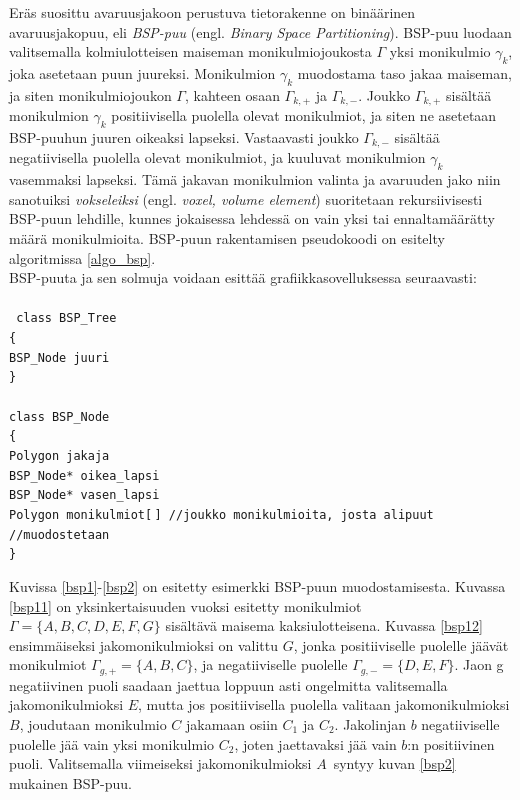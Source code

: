﻿\documentclass[a4paper, 12pt, titlepage]{article}
\newcommand{\tab}[1][0.5cm]{\hspace*{#1}} %
\newcommand{\code}[1]{\small\texttt{#1}} %
\begin{document}
Eräs suosittu avaruusjakoon perustuva tietorakenne on binäärinen avaruusjakopuu, eli \emph{BSP-puu} (engl. \emph{Binary Space Partitioning}). BSP-puu luodaan valitsemalla kolmiulotteisen maiseman  monikulmiojoukosta $\Gamma$ yksi monikulmio $\gamma_k$, joka asetetaan puun juureksi. Monikulmion $\gamma_k$ muodostama taso jakaa maiseman, ja siten monikulmiojoukon $\Gamma$, kahteen osaan $\Gamma_{k,+}$ ja $\Gamma_{k,-}$. Joukko $\Gamma_{k,+}$ sisältää monikulmion $\gamma_k$ positiivisella puolella olevat monikulmiot, ja siten ne asetetaan BSP-puuhun juuren oikeaksi lapseksi. Vastaavasti joukko $\Gamma_{k,-}$ sisältää negatiivisella puolella olevat monikulmiot, ja kuuluvat monikulmion $\gamma_k$ vasemmaksi lapseksi. Tämä jakavan monikulmion valinta ja avaruuden jako niin sanotuiksi \emph{vokseleiksi} (engl. \emph{voxel, volume element}) suoritetaan rekursiivisesti BSP-puun lehdille, kunnes jokaisessa lehdessä on vain yksi tai ennaltamäärätty määrä monikulmioita. \citep[.]{samet} BSP-puun rakentamisen pseudokoodi on esitelty algoritmissa \ref{algo_bsp}.\\

BSP-puuta ja sen solmuja voidaan esittää grafiikkasovelluksessa seuraavasti:\\\\%
\code{
class BSP\_Tree\\
\{\\
\tab BSP\_Node juuri\\
\}\\\\
class BSP\_Node\\
\{\\
\tab Polygon jakaja\\
\tab BSP\_Node* oikea\_lapsi\\
\tab BSP\_Node* vasen\_lapsi\\
\tab Polygon monikulmiot[$\,$] \tab //joukko monikulmioita, josta alipuut\\ 
\hspace*{5.2cm} //muodostetaan\\
\}\\}


\vspace{-0.5cm}

Kuvissa \ref{bsp1}-\ref{bsp2} on esitetty esimerkki BSP-puun muodostamisesta. Kuvassa \ref{bsp11} on yksinkertaisuuden vuoksi esitetty monikulmiot $\Gamma=\{A,B,C,D,E,F,G\}$ sisältävä maisema kaksiulotteisena. Kuvassa \ref{bsp12} ensimmäiseksi jakomonikulmioksi on valittu $G$, jonka positiiviselle puolelle jäävät monikulmiot $\Gamma_{g,+} = \{A,B,C\}$, ja negatiiviselle puolelle $\Gamma_{g,-} = \{D,E,F\}$. Jaon g negatiivinen puoli saadaan jaettua loppuun asti ongelmitta valitsemalla jakomonikulmioksi $E$, mutta jos positiivisella puolella valitaan jakomonikulmioksi $B$, joudutaan monikulmio $C$ jakamaan osiin $C_1$ ja $C_2$. Jakolinjan $b$ negatiiviselle puolelle jää vain yksi monikulmio $C_2$, joten jaettavaksi jää vain $b$:n positiivinen puoli. Valitsemalla viimeiseksi jakomonikulmioksi $A$ syntyy kuvan \ref{bsp2} mukainen BSP-puu.\\
\end{document}
